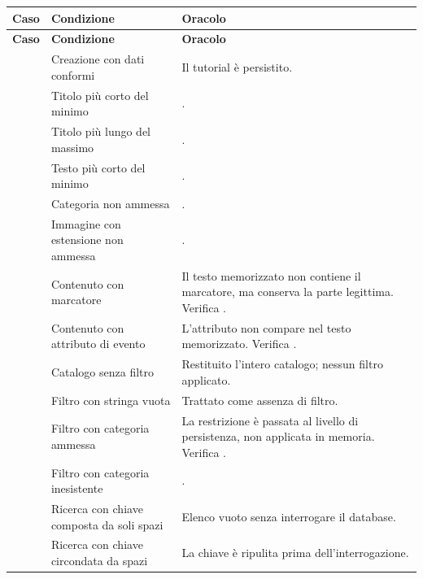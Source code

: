 \begin{longtable}{@{}l L{5.0cm} L{7.4cm}@{}}
\toprule
\textbf{Caso} & \textbf{Condizione} & \textbf{Oracolo} \\
\midrule
\endfirsthead
\toprule
\textbf{Caso} & \textbf{Condizione} & \textbf{Oracolo} \\
\midrule
\endhead
\bottomrule
\endlastfoot

 & Creazione con dati conformi & Il tutorial è persistito. \\
 & Titolo più corto del minimo & . \\
 & Titolo più lungo del massimo & . \\
 & Testo più corto del minimo & . \\
 & Categoria non ammessa & . \\
 & Immagine con estensione non ammessa & . \\

 & Contenuto con marcatore  &
Il testo memorizzato non contiene il marcatore, ma conserva la parte
legittima. Verifica . \\

 & Contenuto con attributo di evento &
L'attributo non compare nel testo memorizzato. Verifica . \\

 & Catalogo senza filtro &
Restituito l'intero catalogo; nessun filtro applicato. \\

 & Filtro con stringa vuota &
Trattato come assenza di filtro. \\

 & Filtro con categoria ammessa &
La restrizione è passata al livello di persistenza, non applicata in memoria.
Verifica . \\

 & Filtro con categoria inesistente & . \\

 & Ricerca con chiave composta da soli spazi &
Elenco vuoto senza interrogare il database. \\

 & Ricerca con chiave circondata da spazi &
La chiave è ripulita prima dell'interrogazione. \\


\end{longtable}
